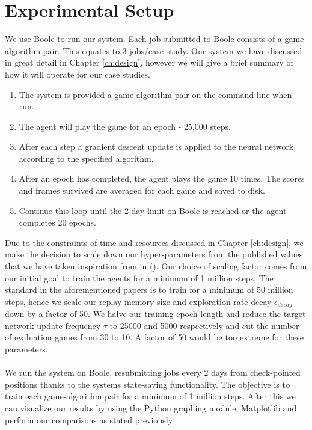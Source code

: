 \section{Experimental Setup} \label{sec:setup}
We use Boole to run our system. Each job submitted to Boole consists of a
game-algorithm pair. This equates to 3 jobs/case study. Our system we have discussed in great detail
in Chapter \ref{ch:design}, however we will give a brief summary of how it will operate for our case
studies.

\begin{enumerate}
	\item The system is provided a game-algorithm pair on the command line when run.
	\item The agent will play the game for an epoch - 25,000 steps.
	\item After each step a gradient descent update is applied to the neural network, according to
	      the specified algorithm.
	\item After an epoch has completed, the agent plays the game 10 times. The scores and frames
	      survived are averaged for each game and saved to disk.
	\item Continue this loop until the 2 day limit on Boole is reached or the agent completes 20
	      epochs.
\end{enumerate}

Due to the constraints of time and resources discussed in Chapter \ref{ch:design}, we make the decision to scale down our hyper-parameters from the published values that we have taken inspiration from in (\citet{deepmind1,human,doubleq,dueling}). Our choice of scaling factor comes from our initial goal to train the agents for a minimum of 1 million steps. The standard in the aforementioned papers is to train for a minimum of 50 million steps, hence we scale our replay memory size and exploration rate decay $\epsilon_{decay}$ down by a factor of 50. We halve our training epoch length and reduce the target network update frequency $\tau$ to 25000 and 5000 respectively and cut the number of evaluation games from 30 to 10. A factor of 50 would be too extreme for these parameters.
\paragraph{}

We run the system on Boole, resubmitting jobs every 2 days from check-pointed positions thanks to
the systems state-saving functionality. The objective is to train each game-algorithm pair for a
minimum of 1 million steps. After this we can visualize our results by using the Python graphing
module, Matplotlib \cite{matplotlib} and perform our comparisons as stated previously.

